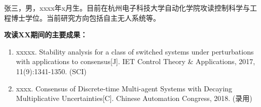 

\personalresult

张三，男，xxxx年x月生。目前在杭州电子科技大学自动化学院攻读控制科学与工程博士学位。当前研究方向包括自主无人系统等。
{\par\bfseries \noindent 攻读XX期间的主要成果：}
\begin{enumerate}
  \item  xxxxx. \newblock Stability analysis for a class of switched systems under
perturbations with applications to consensus[J].
\newblock IET Control Theory \& Applications, 2017, 11(9):1341-1350. (SCI)
  \item xxxx.
\newblock Consensus of Discrete-time Multi-agent Systems with Decaying Multiplicative Uncertainties[C].
\newblock Chinese Automation Congress, 2018. (录用)

\end{enumerate}

